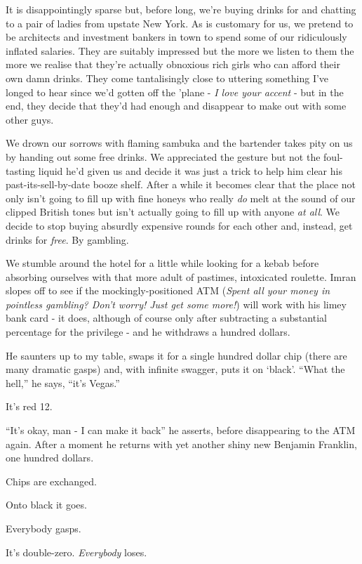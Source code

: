 \documentclass[a5paper,10pt,titlepage,draft]{book}
\begin{document}
It is disappointingly sparse but, before long, we're buying drinks for and chatting to a pair of ladies from upstate New York.  As is customary for us, we pretend to be architects and investment bankers in town to spend some of our ridiculously inflated salaries.  They are suitably impressed but the more we listen to them the more we realise that they're actually obnoxious rich girls who can afford their own damn drinks.  They come tantalisingly close to uttering something I've longed to hear since we'd gotten off the 'plane - \emph{I love your accent} - but in the end, they decide that they'd had enough and disappear to make out with some other guys.

We drown our sorrows with flaming sambuka and the bartender takes pity on us by handing out some free drinks.  We appreciated the gesture but not the foul-tasting liquid he'd given us and decide it was just a trick to help him clear his past-its-sell-by-date booze shelf.  After a while it becomes clear that the place not only isn't going to fill up with fine honeys who really \emph{do} melt at the sound of our clipped British tones but isn't actually going to fill up with anyone \emph{at all}.  We decide to stop buying absurdly expensive rounds for each other and, instead, get drinks for \emph{free}.  By gambling.

We stumble around the hotel for a little while looking for a kebab before absorbing ourselves with that more adult of pastimes, intoxicated roulette.  Imran slopes off to see if the mockingly-positioned ATM (\emph{Spent all your money in pointless gambling?  Don't worry!  Just get some more!}) will work with his limey bank card - it does, although of course only after subtracting a substantial percentage for the privilege - and he withdraws a hundred dollars.

He saunters up to my table, swaps it for a single hundred dollar chip (there are many dramatic gasps) and, with infinite swagger, puts it on `black'.  ``What the hell,'' he says, ``it's Vegas.''

It's red 12.

``It's okay, man - I can make it back'' he asserts, before disappearing to the ATM again.  After a moment he returns with yet another shiny new Benjamin Franklin, one hundred dollars.

Chips are exchanged.

Onto black it goes.

Everybody gasps.

It's double-zero.  \emph{Everybody} loses.
\end{document}
